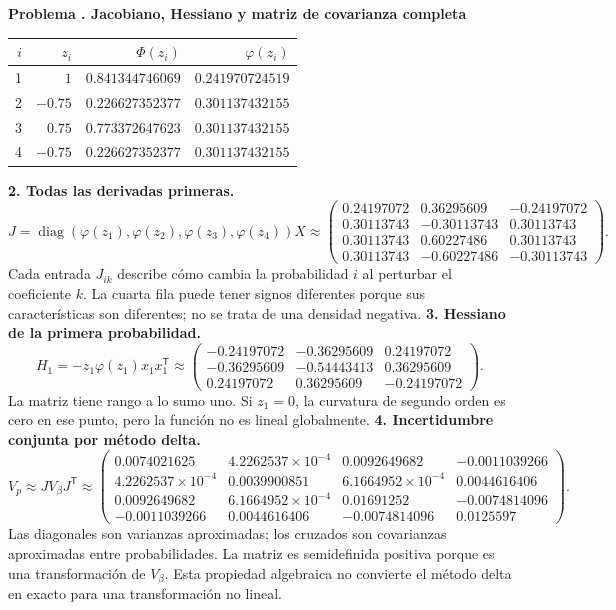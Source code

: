 \documentclass[11pt,a4paper]{article}
\newcommand{\T}{^{\mathsf T}}
\DeclareMathOperator{\diag}{diag}
\theoremstyle{definition}
\newcounter{problema}
\newenvironment{resuelto}[1]{\refstepcounter{problema}\par\medskip\Needspace{6\baselineskip}\textbf{Problema \theproblema. #1}\par}{\par\medskip}
\begin{document}
\begin{resuelto}{Jacobiano, Hessiano y matriz de covarianza completa}
\begin{center}\small\begin{tabular}{rrrr}
\toprule
$i$&$z_i$&$\Phi(z_i)$&$\varphi(z_i)$\\
\midrule
1&$1$&$0.841344746069$&$0.241970724519$\\
2&$-0.75$&$0.226627352377$&$0.301137432155$\\
3&$0.75$&$0.773372647623$&$0.301137432155$\\
4&$-0.75$&$0.226627352377$&$0.301137432155$\\
\bottomrule\end{tabular}\end{center}
\textbf{2. Todas las derivadas primeras.}
\[
J=\diag(\varphi(z_1),\varphi(z_2),\varphi(z_3),\varphi(z_4))X\approx\begin{pmatrix}0.24197072&0.36295609&-0.24197072\\0.30113743&-0.30113743&0.30113743\\0.30113743&0.60227486&0.30113743\\0.30113743&-0.60227486&-0.30113743\end{pmatrix}.
\]
Cada entrada $J_{ik}$ describe cómo cambia la probabilidad $i$ al perturbar el coeficiente $k$. La cuarta fila puede tener signos diferentes porque sus características son diferentes; no se trata de una densidad negativa.
\textbf{3. Hessiano de la primera probabilidad.}
\[
H_1=-z_1\varphi(z_1)x_1x_1\T\approx\begin{pmatrix}-0.24197072&-0.36295609&0.24197072\\-0.36295609&-0.54443413&0.36295609\\0.24197072&0.36295609&-0.24197072\end{pmatrix}.
\]
La matriz tiene rango a lo sumo uno. Si $z_1=0$, la curvatura de segundo orden es cero en ese punto, pero la función no es lineal globalmente.
\textbf{4. Incertidumbre conjunta por método delta.}
\[
V_p\approx JV_\beta J\T\approx\begin{pmatrix}0.0074021625&4.2262537\times10^{-4}&0.0092649682&-0.0011039266\\4.2262537\times10^{-4}&0.0039900851&6.1664952\times10^{-4}&0.0044616406\\0.0092649682&6.1664952\times10^{-4}&0.01691252&-0.0074814096\\-0.0011039266&0.0044616406&-0.0074814096&0.0125597\end{pmatrix}.
\]
Las diagonales son varianzas aproximadas; los cruzados son covarianzas aproximadas entre probabilidades. La matriz es semidefinida positiva porque es una transformación de $V_\beta$. Esta propiedad algebraica no convierte el método delta en exacto para una transformación no lineal.

\end{resuelto}
\end{document}
